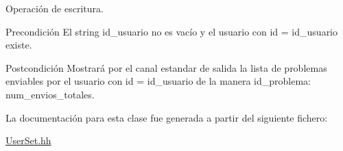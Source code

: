 Operación de escritura. 

\begin{DoxyPrecond}{Precondición}
El string id\+\_\+usuario no es vacío y el usuario con id = id\+\_\+usuario existe. 
\end{DoxyPrecond}
\begin{DoxyPostcond}{Postcondición}
Mostrará por el canal estandar de salida la lista de problemas enviables por el usuario con id = id\+\_\+usuario de la manera id\+\_\+problema\+: num\+\_\+envios\+\_\+totales. 
\end{DoxyPostcond}


La documentación para esta clase fue generada a partir del siguiente fichero\+:\begin{DoxyCompactItemize}
\item 
\mbox{\hyperlink{_user_set_8hh}{User\+Set.\+hh}}\end{DoxyCompactItemize}
